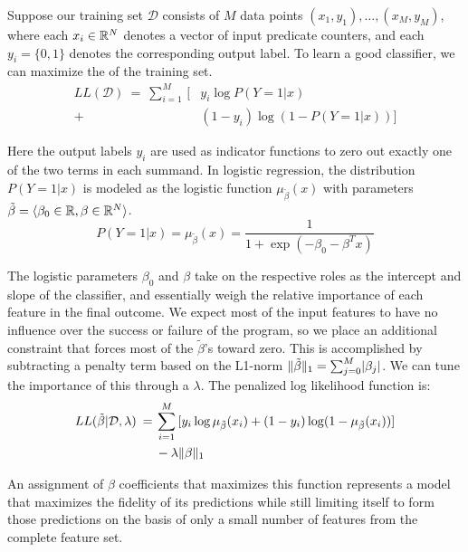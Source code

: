 Suppose our training set $\mathcal{D}$ consists of $M$ data points
$(x_1,y_1), \ldots, (x_M, y_M) $, where each $x_i \in \mathbb{R}^N$ denotes
a vector of input predicate counters, and each $y_i = \{0, 1\}$
denotes the corresponding output label.  To learn a good classifier,
we can maximize the  of the training set.
\begin{equation*}
  \begin{split}
    LL(\mathcal{D}) \:=\:
    \sum_{i=1}^M \, [ & y_i \log P(Y = 1 | x) \\
    + & (1 - y_i) \log (1 - P(Y = 1 | x)) ]
  \end{split}
\end{equation*}

Here the output labels $y_i$ are used as indicator functions to zero
out exactly one of the two terms in each summand.  In logistic
regression, the distribution $P(Y=1|x)$ is modeled as the logistic
function $\mu_{\tilde{\beta}}(x)$ with parameters $\tilde{\beta} = \langle \beta_0 \in
\mathbb{R}, \beta \in \mathbb{R}^N \rangle$.
\begin{equation*}
  P(Y = 1 | x) = \mu_{\tilde{\beta}} (x) = \frac{1}{1 + \exp(- \beta_0 - \beta^T x)}
\end{equation*}

The logistic parameters $\beta_0$ and $\beta$ take on the respective roles as
the intercept and slope of the classifier, and essentially weigh the
relative importance of each feature in the final outcome.  We expect
most of the input features to have no influence over the success or
failure of the program, so we place an additional constraint that
forces most of the $\tilde{\beta}$'s toward zero.  This is accomplished by
subtracting a penalty term based on the L1-norm $\lVert\tilde{\beta}\rVert_1 =
\sum_{j=0}^M \lvert\beta_j\rvert$.  We can tune the importance of this
 through a  $\lambda$.  The penalized log likelihood function is:
\begin{equation*}
  \begin{split}
    LL (\tilde{\beta} | \mathcal{D}, \lambda ) \:=\:
    & \sum_{i=1}^M \, [y_i \log \mu_{\tilde{\beta}} (x_i) + (1 - y_i) \log (1 - \mu_{\tilde{\beta}} (x_i))] \\
    & - \lambda \lVert\beta\rVert_1
  \end{split}
\end{equation*}

An assignment of $\beta$ coefficients that maximizes this function
represents a model that maximizes the fidelity of its predictions
while still limiting itself to form those predictions on the basis of
only a small number of features from the complete feature set.

